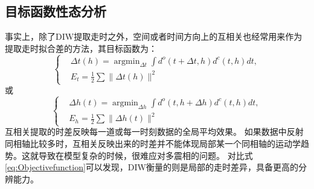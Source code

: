 \subsection{目标函数性态分析}
事实上，除了DIW提取走时之外，空间或者时间方向上的互相关也经常用来作为提取走时拟合差的方法\cite{vanLeeuwen:2010,chi2015,Wang2015}，其目标函数为：
\begin{equation}
\left\{
	\begin{aligned}
		&\Delta t(h)=\mathop{\arg\min}_{\Delta t}\int d^{o}(t+\Delta t,h)d^{c}(t,h)dt,\\
	&E_t=\frac{1}{2}\sum\parallel \Delta t(h)\parallel ^2
	\end{aligned}
	\right.
    \label{eq:Obj_TimeCorr} 
\end{equation}
或
\begin{equation}
\left\{
	\begin{aligned}
		&\Delta h(t)=\mathop{\arg\min}_{\Delta h}\int d^{o}(t,h+\Delta h)d^{c}(t,h)dt,\\
	&E_h=\frac{1}{2}\sum\parallel \Delta h(t)\parallel ^2
	\end{aligned}
	\right.
    \label{eq:Obj_SpatialCorr} 
\end{equation}
互相关提取的时差反映每一道或每一时刻数据的全局平均效果。
如果数据中反射同相轴比较多时，互相关反映出来的时差并不能体现局部某一个同相轴的运动学趋势。这就导致在模型复杂的时候，很难应对多震相的问题。
对比式\eqref{eq:Objectivefunction}可以发现，DIW衡量的则是局部的走时差异，具备更高的分辨能力。

